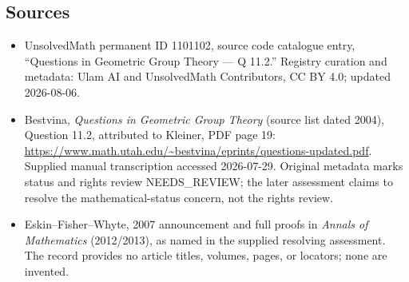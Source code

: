\documentclass[11pt]{article}
\begin{document}
\subsection{Sources}
\begin{itemize}
\item UnsolvedMath permanent ID 1101102, source code catalogue entry, ``Questions in Geometric Group Theory --- Q 11.2.'' Registry curation and metadata: Ulam AI and UnsolvedMath Contributors, CC BY 4.0; updated 2026-08-06.
\item Bestvina, \emph{Questions in Geometric Group Theory} (source list dated 2004), Question 11.2, attributed to Kleiner, PDF page 19: \url{https://www.math.utah.edu/~bestvina/eprints/questions-updated.pdf}. Supplied manual transcription accessed 2026-07-29. Original metadata marks status and rights review NEEDS\_REVIEW; the later assessment claims to resolve the mathematical-status concern, not the rights review.
\item Eskin--Fisher--Whyte, 2007 announcement and full proofs in \emph{Annals of Mathematics} (2012/2013), as named in the supplied resolving assessment. The record provides no article titles, volumes, pages, or locators; none are invented.
\end{itemize}
\end{document}
